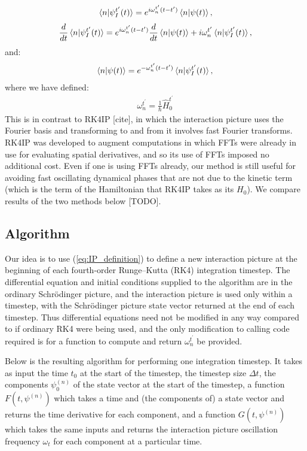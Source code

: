 \begin{align}\label{eq:IP_definition_components}
\braket*{n}{\psi_I^{t^\prime}(t)} = e^{ i \omega_n^{t^\prime}(t - t^\prime)}\braket{n}{\psi(t)},
\end{align}
\begin{align}\label{eq:IPDE_components}
\frac d {dt} \braket*{n}{\psi_I^{t^\prime}(t)}
    = e^{i \omega_n^{t^\prime}(t - t^\prime)}\frac d {dt} \braket{n}{\psi(t)}
      + i\omega_n^{t^\prime}\braket*{n}{\psi_I^{t^\prime}(t)},
\end{align}
and:
\begin{align}\label{eq:backtransform_components}
\braket{n}{\psi(t)} = e^{-\omega_n^{t^\prime}(t - t^\prime)}\braket*{n}{\psi_I^{t^\prime}(t)},
\end{align}
where we have defined:
\begin{align}\label{eq:omega}
\omega_n^{t^\prime} = \frac 1\hbar \hat H_0^{t^\prime}
\end{align}
This is in contrast to RK4IP [cite], in which the interaction picture uses the Fourier basis and transforming to and from it involves fast Fourier transforms. RK4IP was developed to augment computations in which FFTs were already in use for evaluating spatial derivatives, and so its use of FFTs imposed no additional cost. Even if one is using FFTs already, our method is still useful for avoiding fast oscillating dynamical phases that are not due to the kinetic term (which is the term of the Hamiltonian that RK4IP takes as its $H_0$). We compare results of the two methods below [TODO].

\subsection{Algorithm}
Our idea is to use (\ref{eq:IP_definition}) to define a new interaction picture at the beginning of each fourth-order Runge–Kutta (RK4) integration timestep. The differential equation and initial conditions supplied to the algorithm are in the ordinary Schrödinger picture, and the interaction picture is used only within a timestep, with the Schrödinger picture state vector returned at the end of each timestep. Thus differential equations need not be modified in any way compared to if ordinary RK4 were being used, and the only modification to calling code required is for a function to compute and return $\omega_n^{t^\prime}$ be provided.

Below is the resulting algorithm for performing one integration timestep. It takes as input the time $t_0$ at the start of the timestep, the timestep size $\Delta t$, the components $\psi_0^{(n)}$ of the state vector at the start of the timestep, a function $F(t, \psi^{(n)})$ which takes a time and (the components of) a state vector and returns the time derivative for each component, and a function $G(t, \psi^{(n)})$ which takes the same inputs and returns the interaction picture oscillation frequency $\omega_{t}$ for each component at a particular time.

